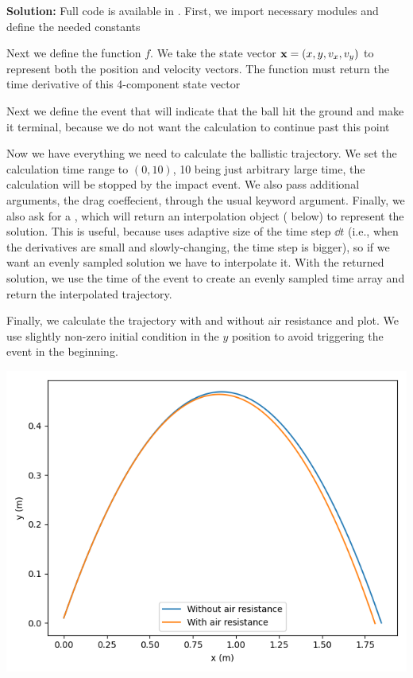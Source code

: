 \textbf{Solution:}
Full code is available in . First, we import necessary modules and define the needed constants


Next we define the function $f$. We take the state vector $\mathbf{x} = (x, y, v_x, v_y)$ to represent both the position and velocity vectors. The function must return the time derivative of this 4-component state vector


Next we define the event that will indicate that the ball hit the ground and make it terminal, because we do not want the calculation to continue past this point


Now we have everything we need to calculate the ballistic trajectory. We set the calculation time range to $(0, 10)$, 10 being just arbitrary large time, the calculation will be stopped by the impact event. We also pass additional arguments, the drag coeffecient, through the usual  keyword argument. Finally, we also ask for a , which will return an interpolation object ( below) to represent the solution. This is useful, because  uses adaptive size of the time step $\dd t$ (i.e., when the derivatives are small and slowly-changing, the time step is bigger), so if we want an evenly sampled solution we have to interpolate it. With the returned solution, we use the time of the event to create an evenly sampled time array and return the interpolated trajectory.

Finally, we calculate the trajectory with and without air resistance and plot. We use slightly non-zero initial condition in the $y$ position to avoid triggering the event in the beginning.


% 
\begin{center}
    \includegraphics[width=0.6\linewidth]{ballistic.png}
\end{center}

